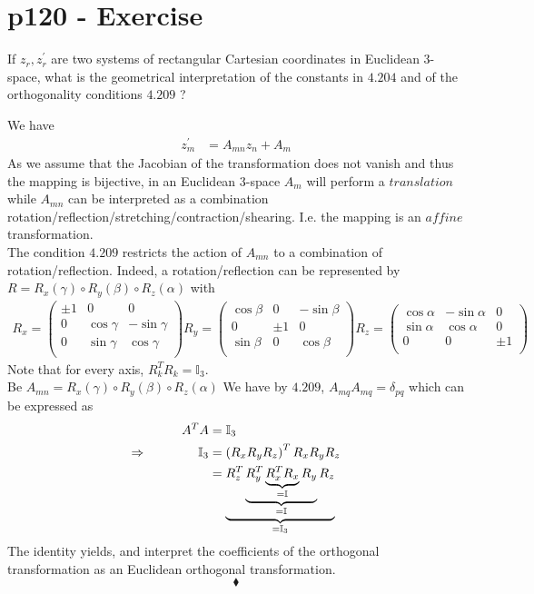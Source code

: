 \section{p120 - Exercise}
\begin{tcolorbox}
If $z_r, z^{'}_r$ are two systems of rectangular Cartesian coordinates in Euclidean 3-space, what is the geometrical interpretation of the constants in $\mathbf{4.204}$ and of the orthogonality conditions $\mathbf{4.209}$ ?
\end{tcolorbox}
We have 
\begin{align}
z^{'}_m &= A_{mn}z_n+A_m 
\end{align}
As we assume that the Jacobian of the transformation does not vanish and thus the mapping is bijective, in an Euclidean 3-space $A_m$ will perform a $\mathit{translation}$ while $A_{mn}$ can be interpreted as a combination rotation/reflection/stretching/contraction/shearing. I.e. the mapping is an $\mathit{affine}$ transformation.\\
The condition $\mathbf{4.209}$ restricts the action of $A_{mn}$ to a combination of rotation/reflection. Indeed, a rotation/reflection can be represented by $R= R_x\left(\gamma\right) \circ R_y\left(\beta\right)\circ  R_z\left(\alpha\right)$ with 
\begin{align}
R_x = \begin{pmatrix}
\pm 1&0  &0  \\
0&\cos\gamma & -\sin\gamma \\
 0&\sin\gamma & \cos\gamma   \\
\end{pmatrix}
R_y = \begin{pmatrix}
\cos\beta & 0& -\sin\beta \\
 0& \pm 1&0 \\
 \sin\beta & 0& \cos\beta\\
\end{pmatrix}
R_z = \begin{pmatrix}
\cos\alpha & -\sin\alpha  & 0 \\
 \sin\alpha & \cos\alpha  & 0 \\
  0&0  & \pm 1 \\
\end{pmatrix}
\end{align}
Note that for every axis, $R_k^{T} R_k^{} = \mathbb{I}_3$.\\
Be $A_{mn} = R_x\left(\gamma\right) \circ R_y\left(\beta\right)\circ  R_z\left(\alpha\right)$
We have by $\mathbf{4.209}$, $A_{mq}A_{mq}= \delta_{pq}$ which can be expressed as 
\begin{align}
A^{T}A &= \mathbb{I}_3\\
\Rightarrow \quad\quad\quad\quad \mathbb{I}_3 &= \left( R_x R_y R_z\right)^T R_xR_yR_z\\
&=  \underbrace{R_z^T \underbrace{R_y^T\underbrace{R_x^TR_x}_{= \mathbb{I}} R_y}_{= \mathbb{I}}R_z}_{= \mathbb{I}_3}
\end{align}
The identity yields, and interpret the coefficients of the orthogonal transformation as an Euclidean orthogonal transformation. 
$$\blacklozenge$$
\newpage

